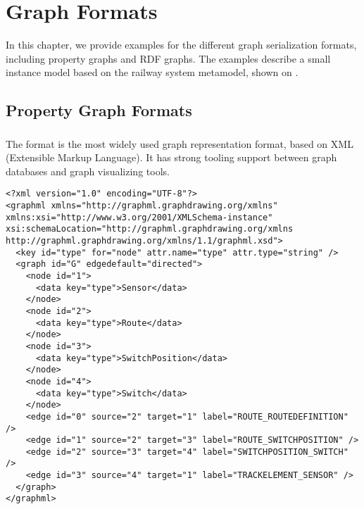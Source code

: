 \appendix
 
\chapter{Graph Formats}

In this chapter, we provide examples for the different graph serialization formats, including property graphs and RDF graphs. The examples describe a small instance model based on the railway system metamodel, shown on .

 
\section{Property Graph Formats}
\label{property-graph-formats}

\subsection{\graphml{}}
\label{graphml-example}

The \graphml{} format \cite{GraphML} is the most widely used graph representation format, based on XML (Extensible Markup Language). It has strong tooling support between graph databases and graph visualizing tools.

\lstset{language=XML,breaklines=true}
\begin{lstlisting}[caption=A graph based on the railway system metamodel stored in \graphml{} format]
<?xml version="1.0" encoding="UTF-8"?>
<graphml xmlns="http://graphml.graphdrawing.org/xmlns" xmlns:xsi="http://www.w3.org/2001/XMLSchema-instance" xsi:schemaLocation="http://graphml.graphdrawing.org/xmlns http://graphml.graphdrawing.org/xmlns/1.1/graphml.xsd">
  <key id="type" for="node" attr.name="type" attr.type="string" />
  <graph id="G" edgedefault="directed">
    <node id="1">
      <data key="type">Sensor</data>
    </node>
    <node id="2">
      <data key="type">Route</data>
    </node>
    <node id="3">
      <data key="type">SwitchPosition</data>
    </node>
    <node id="4">
      <data key="type">Switch</data>
    </node>
    <edge id="0" source="2" target="1" label="ROUTE_ROUTEDEFINITION" />
    <edge id="1" source="2" target="3" label="ROUTE_SWITCHPOSITION" />
    <edge id="2" source="3" target="4" label="SWITCHPOSITION_SWITCH" />
    <edge id="3" source="4" target="1" label="TRACKELEMENT_SENSOR" />
  </graph>
</graphml>
\end{lstlisting}

